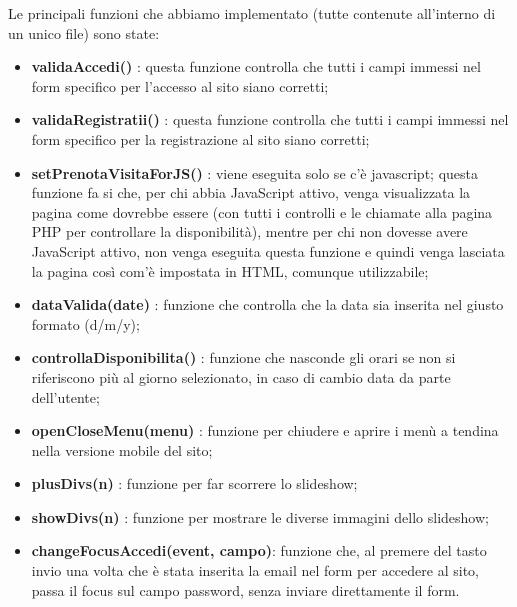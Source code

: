 Le principali funzioni che abbiamo implementato (tutte contenute all’interno di un unico file) sono state:
\begin{itemize}
\item \textbf{validaAccedi()} : questa funzione controlla che tutti i campi immessi nel form specifico per l'accesso al sito siano corretti;
\item \textbf{validaRegistratii()} : questa funzione controlla che tutti i campi immessi nel form specifico per la registrazione al sito siano corretti;
\item \textbf{setPrenotaVisitaForJS()} : viene eseguita solo se c'è javascript;
questa funzione fa si che, per chi abbia JavaScript attivo, venga visualizzata la pagina come dovrebbe essere (con tutti i controlli e le chiamate alla pagina PHP per controllare la disponibilità), mentre per chi non dovesse avere JavaScript attivo, non venga eseguita questa funzione e quindi venga lasciata la pagina così com'è impostata in HTML, comunque utilizzabile;
\item \textbf{dataValida(date)} : funzione che controlla che la data sia inserita nel giusto formato (d/m/y);
\item \textbf{controllaDisponibilita()} : funzione che nasconde gli orari se non si riferiscono più al giorno selezionato, in caso di cambio data da parte dell'utente;
\item \textbf{openCloseMenu(menu)} : funzione per chiudere e aprire i menù a tendina nella versione mobile del sito;
\item \textbf{plusDivs(n)} : funzione per far scorrere lo slideshow;
\item \textbf{showDivs(n)} : funzione per mostrare le diverse immagini dello slideshow;
\item \textbf{changeFocusAccedi(event, campo)}: funzione che, al premere del tasto invio una volta che è stata inserita la email nel form per accedere al sito, passa il focus sul campo password, senza inviare direttamente il form. \\
\end{itemize}

